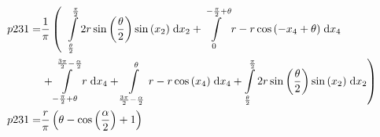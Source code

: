 \begin{align}
    p231 =&\frac{1}{\pi} \left(\;\;\int\limits_{\frac{\theta}{2}}^{\frac{\pi}{2}}2 r \sin{\left (\frac{\theta}{2} \right )} \sin{\left (x_{2} \right )}\;\mathrm{d}x_{2}+\int\limits_{0}^{- \frac{\pi}{2} + \theta}r - r \cos{\left (- x_{4} + \theta \right )}\;\mathrm{d}x_{4}\right.\notag\\
 &\left.+\int\limits_{- \frac{\pi}{2} + \theta}^{\frac{3 \pi}{2} - \frac{\alpha}{2}}r\;\mathrm{d}x_{4}+\int\limits_{\frac{3 \pi}{2} - \frac{\alpha}{2}}^{\theta}r - r \cos{\left (x_{4} \right )}\;\mathrm{d}x_{4}+\int\limits_{\frac{\theta}{2}}^{\frac{\pi}{2}}2 r \sin{\left (\frac{\theta}{2} \right )} \sin{\left (x_{2} \right )}\;\mathrm{d}x_{2}\right)\label{p231Def}\\
    p231 =& \frac{r}{\pi} \left(\theta - \cos{\left (\frac{\alpha}{2} \right )} + 1\right)\label{p231Sln}
\end{align}